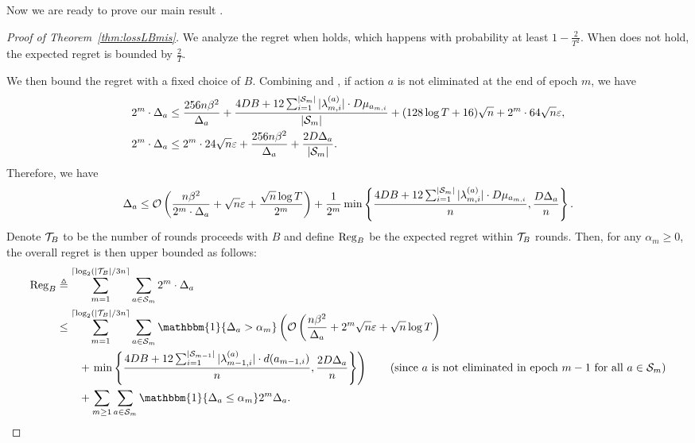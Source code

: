 Now we are ready to prove our main result .
\begin{proof}[Proof of Theorem~\ref{thm:lossLBmis}]
    We analyze the regret when  holds, which happens with probability at least $1-\frac{2}{T^2}$. When  does not hold, the expected regret is bounded by $\frac{2}{T}$.
    
    We then bound the regret with a fixed choice of $B$. Combining  and , if action $a$ is not eliminated at the end of epoch $m$, we have
    \begin{align*}
        2^{m}\cdot \Delta_a&\leq \frac{256n\beta^2}{\Delta_a} +\frac{4DB + 12\sum_{i=1}^{|{\mathcal{S}}_{m}|}|\lambda_{m,i}^{(a)}|\cdot D\mu_{a_{m,i}}}{|{\mathcal{S}}_m|}+(128\log T +16)\sqrt{n}+2^m\cdot 64\sqrt{n}\varepsilon, \\
        2^m\cdot \Delta_a&\leq 2^m\cdot 24\sqrt{n}\varepsilon+\frac{256n\beta^2}{\Delta_a} + \frac{2D\Delta_a}{|{\mathcal{S}}_m|}.
    \end{align*}
    Therefore, we have
    \begin{align*}
        \Delta_a \leq \mathcal{O}\left(\frac{n\beta^2}{2^m\cdot \Delta_a} + \sqrt{n}\varepsilon + \frac{\sqrt{n}\log T}{2^m}\right) +  \frac{1}{2^m}\min\left\{\frac{4DB+12\sum_{i=1}^{|{\mathcal{S}}_m|}|\lambda_{m,i}^{(a)}|\cdot D\mu_{a_{m,i}}}{n}, \frac{D\Delta_a}{n}\right\}.
    \end{align*}
    Denote ${\mathcal{T}}_B$ to be the number of rounds  proceeds with $B$ and define ${\mathrm{Reg}}_B$ be the expected regret within ${\mathcal{T}}_B$ rounds.
    Then, for any $\alpha_m\geq 0$,  the overall regret is then upper bounded as follows:
    \begin{align*}
        \Reg_B &\triangleq \sum_{m= 1}^{\lceil\log_2(|\calT_B|/3n\rceil}\sum_{a\in \calS_m}2^{m}\cdot\Delta_a \\
        &\leq \sum_{m=1}^{\lceil\log_2(|\calT_B|/3n\rceil}\sum_{a\in \calS_m}\mathbbm{1}\{\Delta_a> \alpha_m\}\left(\order\left(\frac{n\beta^2}{\Delta_a} + 2^m\sqrt{n}\epsilon + \sqrt{n}\log T\right) \right.\\
        &\qquad +\left.\min\left\{\frac{4DB+12\sum_{i=1}^{|\calS_{m-1}|}|\lambda_{m-1,i}^{(a)}|\cdot d(a_{m-1,i})}{n}, \frac{2D\Delta_a}{n}\right\}\right) \tag{since $a$ is not eliminated in epoch $m-1$ for all $a\in\calS_m$} \\
        &\qquad + \sum_{m\geq 1}\sum_{a\in \calS_m}\mathbbm{1}\{\Delta_a\leq \alpha_m\}2^m\Delta_a.
    \end{align*}

\end{proof}
